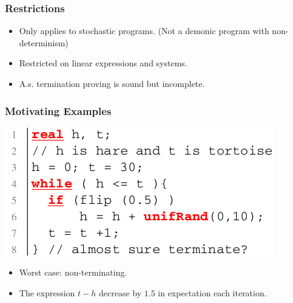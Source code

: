 \documentclass[11pt]{beamer}
\begin{document}
\begin{frame}\frametitle{Restrictions}

\begin{itemize}

\item Only applies to stochastic programs. (Not a demonic program with non-determinism)

\item Restricted on linear expressions and systems.

\item A.s. termination proving is sound but incomplete.
\end{itemize}
\end{frame}

\begin{frame}\frametitle{Motivating Examples}
\begin{example}
\begin{center}
\includegraphics[scale=0.4]{2.png}
\end{center}
\begin{itemize}
\item Worst case: non-terminating.
\item The expression $t - h$ decrease by $1.5$ in expectation each iteration.
\end{itemize}
\end{example}


\end{frame}
\end{document}
